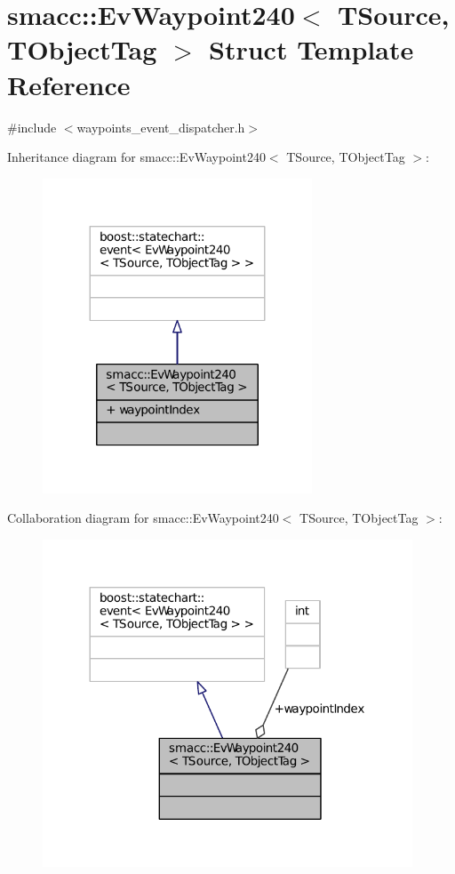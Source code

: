 \hypertarget{structsmacc_1_1EvWaypoint240}{}\section{smacc\+:\+:Ev\+Waypoint240$<$ T\+Source, T\+Object\+Tag $>$ Struct Template Reference}
\label{structsmacc_1_1EvWaypoint240}


{\ttfamily \#include $<$waypoints\+\_\+event\+\_\+dispatcher.\+h$>$}



Inheritance diagram for smacc\+:\+:Ev\+Waypoint240$<$ T\+Source, T\+Object\+Tag $>$\+:
\nopagebreak
\begin{figure}[H]
\begin{center}
\leavevmode
\includegraphics[width=227pt]{structsmacc_1_1EvWaypoint240__inherit__graph}
\end{center}
\end{figure}


Collaboration diagram for smacc\+:\+:Ev\+Waypoint240$<$ T\+Source, T\+Object\+Tag $>$\+:
\nopagebreak
\begin{figure}[H]
\begin{center}
\leavevmode
\includegraphics[width=312pt]{structsmacc_1_1EvWaypoint240__coll__graph}
\end{center}
\end{figure}
